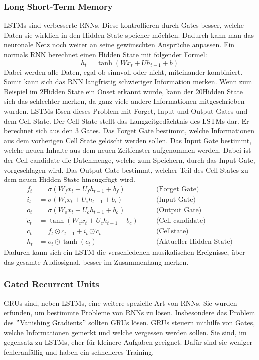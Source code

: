 \subsubsection{Long Short-Term Memory}
LSTMs sind verbesserte RNNs.
Diese kontrollieren durch Gates besser, welche Daten sie wirklich in den Hidden State speicher möchten.
Dadurch kann man das neuronale Netz noch weiter an seine gewünschten Ansprüche anpassen.
Ein normals RNN berechnet einen Hidden State mit folgender Formel:
\begin{equation*}
h_t = \tanh(W x_t + U h_{t-1} + b)
\end{equation*}
Dabei werden alle Daten, egal ob sinnvoll oder nicht, miteinander kombiniert.
Somit kann sich das RNN langfristig schwieriger Information merken.
Wenn zum Beispiel im 2\. Hidden State ein Onset erkannt wurde, kann der 20\. Hidden State
sich das schlechter merken, da ganz viele andere Informationen mitgeschrieben wurden.
LSTMs lösen dieses Problem mit Forget, Input und Output Gates und dem Cell State.
Der Cell State stellt das Langzeitgedächtnis des LSTMs dar.
Er berechnet sich aus den 3 Gates.
Das Forget Gate bestimmt, welche Informationen aus dem vorherigen Cell State gelöscht werden sollen.
Das Input Gate bestimmt, welche neuen Inhalte aus dem neuen Zeitfenster aufgenommen werden.
Dabei ist der Cell-candidate die Datenmenge, welche zum Speichern, durch das Input Gate, vorgeschlagen wird.
Das Output Gate bestimmt, welcher Teil des Cell States zu dem neuen Hidden State hinzugefügt wird.
\begin{align*}
f_t &= \sigma(W_f x_t + U_f h_{t-1} + b_f) \quad &&\text{(Forget Gate)} \\
i_t &= \sigma(W_i x_t + U_i h_{t-1} + b_i) \quad &&\text{(Input Gate)} \\
o_t &= \sigma(W_o x_t + U_o h_{t-1} + b_o) \quad &&\text{(Output Gate)} \\
\tilde{c}_t &= \tanh(W_c x_t + U_c h_{t-1} + b_c) \quad &&\text{(Cell-candidate)} \\
c_t &= f_t \odot c_{t-1} + i_t \odot \tilde{c}_t \quad &&\text{(Cellstate)} \\
h_t &= o_t \odot \tanh(c_t) \quad &&\text{(Aktueller Hidden State)}
\end{align*}
Dadurch kann sich ein LSTM die verschiedenen musikalischen Ereignisse,
über das gesamte Audiosignal, besser im Zusammenhang merken.

\subsubsection{Gated Recurrent Units}
GRUs sind, neben LSTMs, eine weitere spezielle Art von RNNs.
\cite{chung2014empirical}
Sie wurden erfunden, um bestimmte Probleme von RNNs zu lösen.
Insbesondere das Problem des \("\)Vanishing Gradients\("\) sollten GRUs lösen.
GRUs steuern mithilfe von Gates, welche Informationen gemerkt und welche vergessen werden sollen.
Sie sind, im gegensatz zu LSTMs, eher für kleinere Aufgaben geeignet.
Dafür sind sie weniger fehleranfällig und haben ein schnelleres Training.

